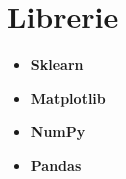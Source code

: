 \section{Librerie}
\begin{itemize}
	\item \textbf{Sklearn}
	\item \textbf{Matplotlib}
	\item \textbf{NumPy}
	\item \textbf{Pandas}
\end{itemize}